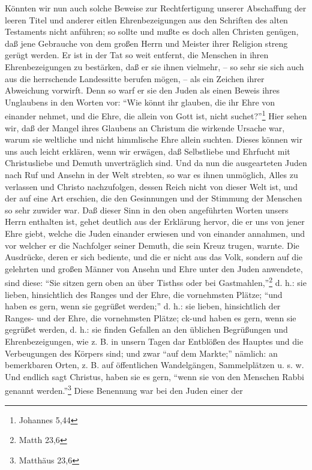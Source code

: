 Könnten wir nun auch solche Beweise zur Rechtfertigung unserer Abschaffung der
leeren Titel und anderer eitlen Ehrenbezeigungen aus den Schriften des alten
Testaments nicht anführen; so sollte und mußte es doch allen Christen genügen,
daß jene Gebrauche von dem großen Herrn und Meister ihrer Religion streng gerügt
werden. Er ist in der Tat so weit entfernt, die Menschen in ihren
Ehrenbezeigungen zu bestärken, daß er sie ihnen vielmehr, -- so sehr sie sich
auch aus die herrschende Landessitte berufen mögen, -- als ein Zeichen ihrer
Abweichung vorwirft. Denn so warf er sie den Juden als einen Beweis ihres
Unglaubens in den Worten vor: "`Wie könnt ihr glauben, die ihr Ehre von einander
nehmet, und die Ehre, die allein von Gott ist, nicht suchet?"'\footnote{Johannes
5,44} Hier sehen wir, daß der Mangel ihres Glaubens an Christum die wirkende
Ursache war, warum sie weltliche und nicht himmlische Ehre allein suchten.
Dieses können wir uns auch leicht erklären, wenn wir erwägen, daß Selbstliebe
und Ehrfucht mit Christusliebe und Demuth unverträglich sind. Und da nun die
ausgearteten Juden nach Ruf und Ansehn in der Welt strebten, so war es ihnen
unmöglich, Alles zu verlassen und Christo nachzufolgen, dessen Reich nicht von
dieser Welt ist, und der auf eine Art erschien, die den Gesinnungen und der
Stimmung der Menschen so sehr zuwider war. Daß dieser Sinn in den oben
angeführten Worten unsers Herrn enthalten ist, gehet deutlich aus der Erklärung
hervor, die er uns von jener Ehre giebt, welche die Juden einander erwiesen und
von einander annahmen, und vor welcher er die Nachfolger seiner Demuth, die sein
Kreuz trugen, warnte. Die Ausdrücke, deren er sich bediente, und die er nicht
aus das Volk, sondern auf die gelehrten und großen Männer von Ansehn und Ehre
unter den Juden anwendete, sind diese: "`Sie sitzen gern oben an über Tisthss
oder bei Gastmahlen,"'\footnote{Matth 23,6} d. h.: sie lieben, hinsichtlich des
Ranges und der Ehre, die vornehmsten Plätze; "`und haben es gern, wenn sie
gegrüßet werden;"' d. h.: sie lieben, hinsichtlich der Ranges- und der Ehre, die
vornehmsten Plätze; ck-und haben es gern, wenn sie gegrüßet werden, d. h.: sie
finden Gefallen an den üblichen Begrüßungen und Ehrenbezeigungen, wie z. B. in
unsern Tagen dar Entblößen des Hauptes und die Verbeugungen des Körpers sind;
und zwar "`auf dem Markte;"' nämlich: an bemerkbaren Orten, z. B. auf
öffentlichen Wandelgängen, Sammelplätzen u. s. w. Und endlich sagt Christus,
haben sie es gern, "`wenn sie von den Menschen Rabbi genannt
werden."'\footnote{Matthäus 23,6} Diese Benennung war bei den Juden einer der
